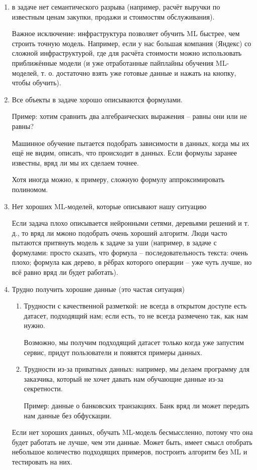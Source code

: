\documentclass[main.tex]{subfiles}
\begin{document}
\begin{enumerate}[noitemsep]
	\item в задаче нет семантического разрыва (например, расчёт выручки по известным ценам закупки, продажи и стоимостям обслуживания).
	
	Важное исключение: инфраструктура позволяет обучить ML быстрее, чем строить точную модель.
	Например, если у нас большая компания (Яндекс) со сложной инфраструктурой, где для расчёта стоимости можно использовать приближённые модели (и уже отработанные пайплайны обучения ML-моделей, т. о. достаточно взять уже готовые данные и нажать на кнопку, чтобы обучить).
	\item Все объекты в задаче хорошо описываются формулами.
	
	Пример: хотим сравнить два алгебраических выражения -- равны они или не равны?
	
	Машинное обучение пытается подобрать зависимости в данных, когда мы их ещё не видим, описать, что происходит в данных.
	Если формулы заранее известны, вряд ли мы их сделаем точнее.
	
	Хотя иногда можно, к примеру, сложную формулу аппроксимировать полиномом.
	
	\item Нет хороших ML-моделей, которые описывают нашу ситуацию
	
	Если задача плохо описывается нейронными сетями, деревьями решений и т. д., то вряд ли мжоно подобрать очень хороший алгоритм.
	Люди часто пытаются притянуть модель к задаче за уши (например, в задаче с формулами: просто сказать, что формула -- последовательность текста: очень плохо; формула как дерево, в рёбрах которого операции -- уже чуть лучше, но всё равно вряд ли будет работать).
	
	\item Трудно получить хорошие данные (это частая ситуация)
	\begin{enumerate}[noitemsep]
		\item Трудности с качественной разметкой: не всегда в открытом доступе есть датасет, подходящий нам; если есть, то не всегда размечено так, как нам нужно.
		
		Возможно, мы получим подходящий датасет только когда уже запустим сервис, придут пользователи и появятся примеры данных.
		\item Трудности из-за приватных данных: например, мы делаем программу для заказчика, который не хочет давать нам обучающие данные из-за секретности.
		
		Пример: данные о банковских транзакциях.
		Банк вряд ли может передать нам данные без обфускации.
	\end{enumerate}
	Если нет хороших данных, обучать ML-модель бесмыссленно, потому что она будет работать не лучше, чем эти данные.
	Может быть, имеет смысл отобрать небольшое количество подходящих примеров, построить алгоритм без ML и тестировать на них.
	

\end{enumerate}
\end{document}
